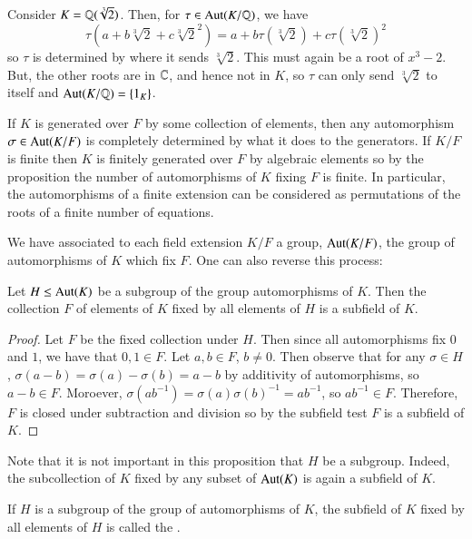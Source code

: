 \begin{example}
    Consider $K = \mathbb Q(\sqrt[3]{2})$. Then, for $\tau \in \operatorname{Aut}(K/\mathbb Q)$, we have \begin{equation*}
        \tau(a+b\sqrt[3]{2}+c\sqrt[3]{2}^2) = a+b\tau(\sqrt[3]{2})+c\tau(\sqrt[3]{2})^2
    \end{equation*}
    so $\tau$ is determined by where it sends $\sqrt[3]{2}$. This must again be a root of $x^3 - 2$. But, the other roots are in $\mathbb C$, and hence not in $K$, so $\tau$ can only send $\sqrt[3]{2}$ to itself and $\operatorname{Aut}(K/\mathbb Q) = \{1_K\}$.
\end{example}

If $K$ is generated over $F$ by some collection of elements, then any automorphism $\sigma \in \operatorname{Aut}(K/F)$ is completely determined by what it does to the generators. If $K/F$ is finite then $K$ is finitely generated over $F$ by algebraic elements so by the proposition the number of automorphisms of $K$ fixing $F$ is finite. In particular, the automorphisms of a finite extension can be considered as permutations of the roots of a finite number of equations. 


We have associated to each field extension $K/F$ a group, $\operatorname{Aut}(K/F)$, the group of automorphisms of $K$ which fix $F$. One can also reverse this process: 

\begin{proposition}
    Let $H \leq \operatorname{Aut}(K)$ be a subgroup of the group automorphisms of $K$. Then the collection $F$ of elements of $K$ fixed by all elements of $H$ is a subfield of $K$.
\end{proposition}
\begin{proof}
    Let $F$ be the fixed collection under $H$. Then since all automorphisms fix $0$ and $1$, we have that $0,1 \in F$. Let $a,b \in F$, $b \neq 0$. Then observe that for any $\sigma \in H$, $\sigma(a-b) = \sigma(a)-\sigma(b) = a-b$ by additivity of automorphisms, so $a-b \in F$. Moroever, $\sigma(ab^{-1}) = \sigma(a)\sigma(b)^{-1} = ab^{-1}$, so $ab^{-1} \in F$. Therefore, $F$ is closed under subtraction and division so by the subfield test $F$ is a subfield of $K$.
\end{proof}

Note that it is not important in this proposition that $H$ be a subgroup. Indeed, the subcollection of $K$ fixed by any subset of $\operatorname{Aut}(K)$ is again a subfield of $K$.

\begin{definition}
    If $H$ is a subgroup of the group of automorphisms of $K$, the subfield of $K$ fixed by all elements of $H$ is called the .
\end{definition}

